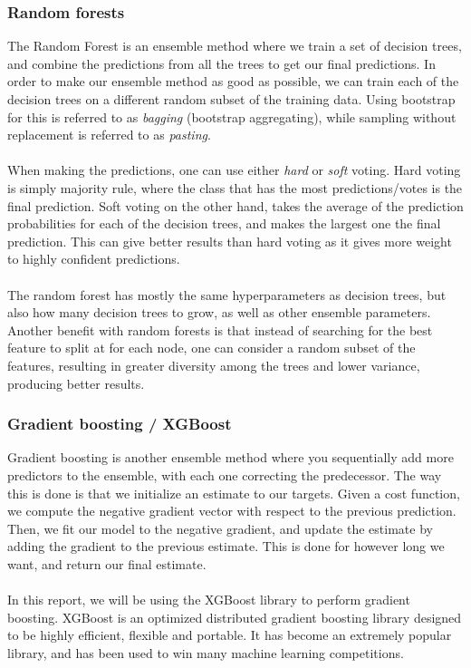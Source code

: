\documentclass[a4paper]{article}
\newcommand\red[1]{\textcolor{red}{\textbf{#1}}}
\begin{document}
\subsubsection{Random forests} \label{sec:random_forest}
The Random Forest is an ensemble method where we train a set of decision trees, and combine the predictions from all the trees to get our final predictions. In order to make our ensemble method as good as possible, we can train each of the decision trees on a different random subset of the training data. Using bootstrap for this is referred to as \textit{bagging} (bootstrap aggregating), while sampling without replacement is referred to as \textit{pasting}.
\\\\
When making the predictions, one can use either \textit{hard} or \textit{soft} voting. Hard voting is simply majority rule, where the class that has the most predictions/votes is the final prediction. Soft voting on the other hand, takes the average of the prediction probabilities for each of the decision trees, and makes the largest one the final prediction. This can give better results than hard voting as it gives more weight to highly confident predictions.
\\\\
The random forest has mostly the same hyperparameters as decision trees, but also how many decision trees to grow, as well as other ensemble parameters. Another benefit with random forests is that instead of searching for the best feature to split at for each node, one can consider a random subset of the features, resulting in greater diversity among the trees and lower variance, producing better results.

\subsubsection{Gradient boosting / XGBoost} \label{sec:xgboost}
Gradient boosting is another ensemble method where you sequentially add more predictors to the ensemble, with each one correcting the predecessor. The way this is done is that we initialize an estimate to our targets. Given a cost function, we compute the negative gradient vector with respect to the previous prediction. Then, we fit our model to the negative gradient, and update the estimate by adding the gradient to the previous estimate. This is done for however long we want, and return our final estimate.
\\\\
In this report, we will be using the XGBoost library \cite{Chen_2016} to perform gradient boosting. XGBoost is an optimized distributed gradient boosting library designed to be highly efficient, flexible and portable. It has become an extremely popular library, and has been used to win many machine learning competitions.
\end{document}
